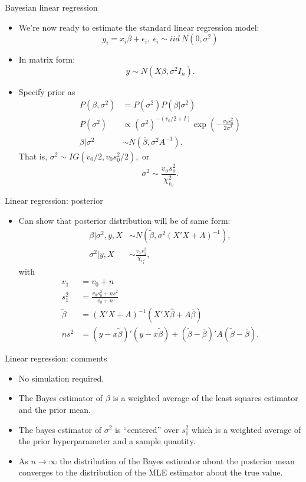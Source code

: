 \documentclass[aspectratio=169]{beamer}
\begin{document}
\begin{frame}{Bayesian linear regression}
\begin{itemize}
\item We're now ready to estimate the standard linear regression model:
\[
y_{i}=x_{i}\beta+\epsilon_{i},\ \epsilon_{i}\sim iid\ N(0,\sigma^{2})
\]
\item In matrix form:
\[
y\sim N(X\beta,\sigma^{2}I_{n}).
\]
\item Specify prior as 
\begin{align*}
P(\beta,\sigma^{2}) & =P(\sigma^{2})P(\beta|\sigma^{2})\\
P(\sigma^{2}) & \propto(\sigma^{2})^{-(v_{0}/2+I)}\exp\left(-\frac{v_{0}s_{0}^{2}}{2\sigma^{2}}\right)\\
\beta|\sigma^{2} & \sim N(\overline{\beta},\sigma^{2}A^{-1}).
\end{align*}
That is, $\sigma^{2}\sim IG(v_{0}/2,v_{0}s_{0}^{2}/2),$ or 
\[
\sigma^{2}\sim\frac{v_{o}s_{o}^{2}}{\chi_{v_{0}}^{2}}.
\]
\end{itemize}
\end{frame}
%
\begin{frame}{Linear regression: posterior}
\begin{itemize}
\item Can show that posterior distribution will be of same form: 
\begin{align*}
\beta|\sigma^{2},y,X & \sim N(\tilde{\beta},\sigma^{2}(X'X+A)^{-1}),\\
\sigma^{2}|y,X & \sim\frac{v_{1}s_{1}^{2}}{\chi_{v_{1}^{2}}},
\end{align*}
 with 
\begin{align*}
v_{1} & =v_{0}+n\\
s_{1}^{2} & =\frac{v_{0}s_{0}^{2}+ns^{2}}{v_{0}+n}\\
\tilde{\beta} & =(X'X+A)^{-1}(X'X\hat{\beta}+A\overline{\beta})\\
ns^{2} & =(y-x\tilde{\beta})'(y-x\tilde{\beta})+(\tilde{\beta}-\overline{\beta})'A(\tilde{\beta}-\overline{\beta}).
\end{align*}
\end{itemize}
\end{frame}
%
\begin{frame}{Linear regression: comments}
\begin{itemize}
\item No simulation required.
\item The Bayes estimator of $\beta$ is a weighted average of the least
squares estimator and the prior mean.
\item The bayes estimator of $\sigma^{2}$ is ``centered'' over $s_{1}^{2}$
which is a weighted average of the prior hyperparameter and a sample
quantity.
\item As $n\rightarrow\infty$ the distribution of the Bayes estimator about
the posterior mean converges to the distribution of the MLE estimator
about the true value.
\end{itemize}
\end{frame}
\end{document}
